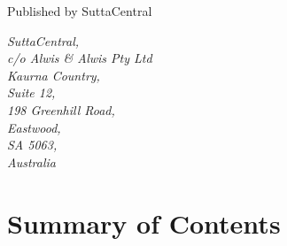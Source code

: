 \documentclass[12pt,openany]{book}%
\begin{document}
\begin{footnotesize}
\medskip

Published by SuttaCentral

\medskip

\textit{SuttaCentral,\\
c/o Alwis \& Alwis Pty Ltd\\
Kaurna Country,\\
Suite 12,\\
198 Greenhill Road,\\
Eastwood,\\
SA 5063,\\
Australia}

\end{footnotesize}

\newpage

\setlength{\parindent}{1em}%
\tableofcontents
\newpage
\pagestyle{fancy}
%
\chapter*{Summary of Contents}
\end{document}

